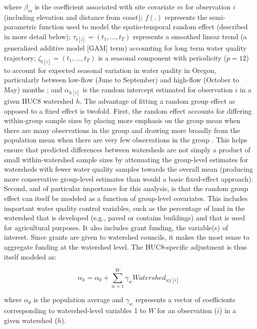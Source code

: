 \documentclass[12pt,a4paper,titlepage]{article}
\begin{document}
where $\beta_{m}$ is the coefficient associated with site covariate $m$ for observation $i$ (including elevation and distance from coast); $f(.)$ represents the semi-parametric function used to model the spatio-temporal random effect (described in more detail below); $\tau_{t[i]}=(t_1,...,t_T)$ represents a smoothed linear trend (a generalized additive model [GAM] term) accounting for long term water quality trajectory; $\zeta_{t[i]} = (t_1,...,t_T)$ is a seasonal component with periodicity ($p=12$) to account for expected seasonal variation in water quality in Oregon, particularly between low-flow (June to September) and high-flow (October to May) months \parencite{cude2001}; and $\alpha_{h[i]}$ is the random intercept estimated for observation $i$ in a given HUC8 watershed $h$. The advantage of fitting a random group effect as opposed to a fixed effect is twofold. First, the random effect accounts for differing within-group sample sizes by placing more emphasis on the group mean when there are many observations in the group and drawing more broadly from the population mean when there are very few observations in the group \parencite{gelman2006,gelman2013}. This helps ensure that predicted differences between watersheds are not simply a product of small within-watershed sample sizes by attenuating the group-level estimates for watersheds with fewer water quality samples towards the overall mean (producing more conservative group-level estimates than would a basic fixed-effect approach). Second, and of particular importance for this analysis, is that the random group effect can itself be modeled as a function of group-level covariates. This includes important water quality control variables, such as the percentage of land in the watershed that is developed (e.g., paved or contains buildings) and that is used for agricultural purposes. It also includes grant funding, the variable(s) of interest. Since grants are given to watershed councils, it makes the most sense to aggregate funding at the watershed level. The HUC8-specific adjustment is thus itself modeled as:

\begin{equation}
\alpha_{h} = \alpha_{0} + \sum_{w=1}^{W}\gamma_{w}Watershed_{wj[i]}
\label{eq:huc8level}
\end{equation}

where $\alpha_0$ is the population average and $\gamma_w$ represents a vector of coefficients corresponding to watershed-level variables 1 to $W$ for an observation ($i$) in a given watershed ($h$).
\end{document}
